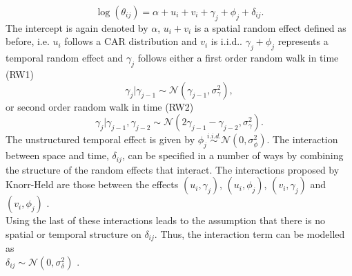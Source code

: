 \begin{equation}
    \log\left(\theta_{ij}\right)=\alpha+u_i+v_i+\gamma_j+\phi_j+\delta_{ij}.
\end{equation}
The intercept is again denoted by $\alpha$, $u_i + v_i$ is a spatial random effect defined as before, i.e. $u_i$ follows a CAR distribution and $v_i$ is i.i.d.. $\gamma_j+\phi_j$ represents a temporal random effect and $\gamma_j$ follows either a first order random walk in time (RW1)
\begin{equation}
    \gamma_j|\gamma_{j-1}\sim\mathcal{N}\left(\gamma_{j-1},\sigma_\gamma^2\right),
\end{equation}
or second order random walk in time (RW2)
\begin{equation}
    \gamma_j|\gamma_{j-1},\gamma_{j-2}\sim\mathcal{N}\left(2\gamma_{j-1}-\gamma_{j-2},\sigma_\gamma^2\right).
\end{equation}
The unstructured temporal effect is given by $\phi_j\overset{i.i.d.}{\sim}\mathcal{N}\left(0, \sigma_\phi^2\right)$. The interaction between space and time, $\delta_{ij}$, can be specified in a number of ways by combining the structure of the random effects that interact. The interactions proposed by Knorr-Held are those between the effects $\left(u_i,\gamma_j\right)$, $\left(u_i,\phi_j\right)$, $\left(v_i,\gamma_j\right)$ and $\left(v_i,\phi_j\right)$ \autocite[][]{knorr2000bayesian}. \\
Using the last of these interactions leads to the assumption that there is no spatial or temporal structure on $\delta_{ij}$. Thus, the interaction term can be modelled as \\ $\delta_{ij}\sim\mathcal{N}\left(0,\sigma_\delta^2\right)$ \autocite[][]{moraga2019geospatial}.
